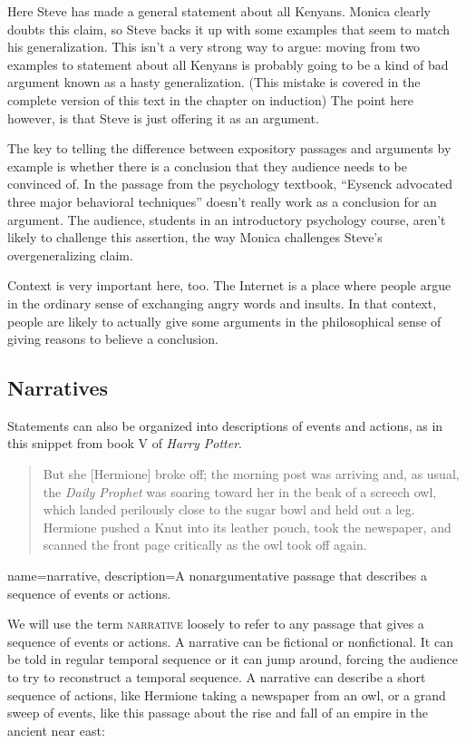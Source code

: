 Here Steve has made a general statement about all Kenyans. Monica clearly doubts this claim, so Steve backs it up with some examples that seem to match his generalization. This isn't a very strong way to argue: moving from two examples to statement about all Kenyans is probably going to be a kind of bad argument known as a hasty generalization. (This mistake is covered in the complete version of this text in the chapter on induction\label{ver_var}) The point here however, is that Steve is just offering it as an argument. 

The key to telling the difference between expository passages and arguments by example is whether there is a conclusion that they audience needs to be convinced of. In the passage from the psychology textbook, ``Eysenck advocated three major behavioral techniques'' doesn't really work as a conclusion for an argument. The audience, students in an introductory psychology course, aren't likely to challenge this assertion, the way Monica  challenges Steve's overgeneralizing claim. 

Context is very important here, too. The Internet is a place where people argue in the ordinary sense of exchanging angry words and insults. In that context, people are likely to actually give some arguments in the philosophical sense of giving reasons to believe a conclusion. 

\subsection{Narratives} 

Statements can also be organized into descriptions of events and actions, as in this snippet from book V of \textit{Harry Potter}.

\begin{quotation} \noindent But she [Hermione] broke off; the morning post was arriving and, as usual, the \textit{Daily Prophet} was soaring toward her in the beak of a screech owl, which landed perilously close to the sugar bowl and held out a leg. Hermione pushed a Knut into its leather pouch, took the newspaper, and scanned the front page critically as the owl took off again. \citep{Rowling2003} \end{quotation} 

{
name=narrative,
description={A nonargumentative passage that describes a sequence of events or actions.}
}

We will use the term \textsc{\gls{narrative}} \label{def:narrative} loosely to refer to any passage that gives a sequence of events or actions. A narrative can be fictional or nonfictional. It can be told in regular temporal sequence or it can jump around, forcing the audience to try to reconstruct a temporal sequence. A narrative can describe a short sequence of actions, like Hermione taking a newspaper from an owl, or a grand sweep of events, like this passage about the  rise and fall of an empire in the ancient near east:

